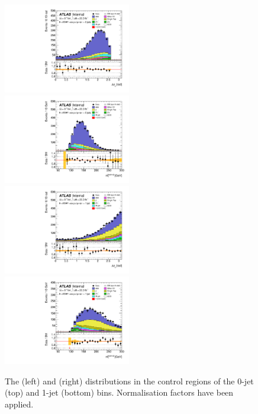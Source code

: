 \begin{figure}
	\includegraphics[width=0.495\textwidth]{tex/ww/emme_CutWWControl_0jet_DPhill_mh125_lin}
	\hfill
	\includegraphics[width=0.495\textwidth]{tex/ww/emme_CutWWControl_0jet_MT_TrackHWW_Clj_mh125_lin}
	\\
	\includegraphics[width=0.495\textwidth]{tex/ww/emme_CutWWControl_1jet_DPhill_mh125_lin}
	\hfill
	\includegraphics[width=0.495\textwidth]{tex/ww/emme_CutWWControl_1jet_MT_TrackHWW_Clj_mh125_lin}
	\caption{The \dphill (left) and \mt (right) distributions in the \WW control regions 
	of the 0-jet (top) and 1-jet (bottom) bins. Normalisation factors have been applied.}
	\label{fig:ww_bkg:cr_plots}
\end{figure}


